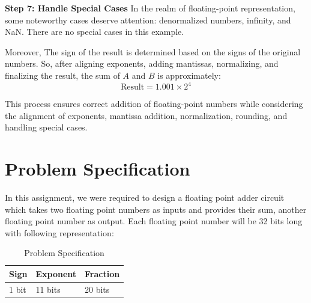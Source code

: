 \documentclass[12pt]{article}
\begin{document}
\textbf{Step 7: Handle Special Cases}
In the realm of floating-point representation, some noteworthy cases deserve attention: denormalized numbers, infinity, and NaN.
There are no special cases in this example.

Moreover,
The sign of the result is determined based on the signs of the original numbers. So, after aligning exponents, adding mantissas, normalizing, and finalizing the result, the sum of \( A \) and \( B \) is approximately:
\[
\text{Result} = 1.001 \times 2^4
\]

This process ensures correct addition of floating-point numbers while considering the alignment of exponents, mantissa addition, normalization, rounding, and handling special cases.



\vspace{1cm}



\section{\large{Problem Specification}}
In this assignment, we were required to design a floating point adder circuit which takes two floating point numbers as inputs
and provides their sum, another floating point number as output. Each floating point number will be 32 bits long with following
representation:
\begin{table}[H]
	\centering
	\begin{tabular}{|p{3cm}|p{3cm}|p{3cm}|}
		\hline
		\large{\textbf{Sign}}&\large{\textbf{Exponent}}&\large{\textbf{Fraction}}  \\
		\hline
		{1 bit}&{11 bits}&{20 bits} \\
		\hline
	\end{tabular}
	\caption{Problem Specification}
	\label{tab:spec}
\end{table}


\newpage





\end{document}
